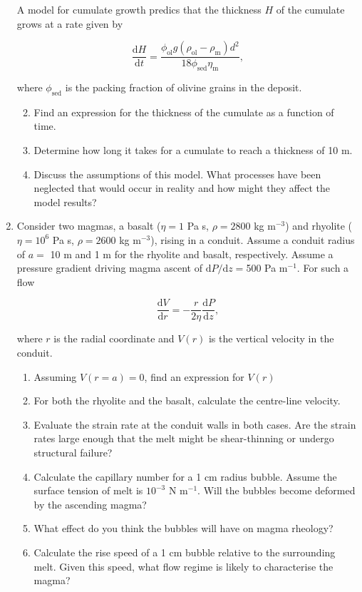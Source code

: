 \documentclass[]{book}
\theoremstyle{definition}
\begin{document}
\begin{enumerate}
  A model for cumulate growth predics that the thickness $H$ of the cumulate grows at a rate given by

  \begin{equation}
    \label{equ:cumulateGrowth}
    \frac{\mathrm{d} H}{\mathrm{d} t} = \frac{\phi_{\text{ol}} g (\rho_{\text{ol}} - \rho_{\text{m}}) d^{2}}{18 \phi_{\text{sed}} \eta_{\text{m}}},
  \end{equation}

  where $\phi_{\text{sed}}$ is the packing fraction of olivine grains in the deposit.

  \begin{enumerate}
    \setcounter{enumii}{1}
  \item Find an expression for the thickness of the cumulate as a function of time.
  \item Determine how long it takes for a cumulate to reach a thickness of 10 m.
  \item Discuss the assumptions of this model. What processes have been neglected that would occur in reality and how might they affect the model results? 
  \end{enumerate}

  
\item Consider two magmas, a basalt ($\eta = 1$ Pa s, $\rho = 2800$ kg m$^{-3}$) and rhyolite ($\eta = 10^{6}$ Pa s, $\rho = 2600$ kg m$^{-3}$), rising in a conduit. Assume a conduit radius of $a = $ 10 m and 1 m for the rhyolite and basalt, respectively. Assume a pressure gradient driving magma ascent of $ \mathrm{d} P / \mathrm{d} z = $500 Pa m$^{-1}$. For such a flow

  $$ \frac{\mathrm{d} V}{\mathrm{d} r} = -\frac{r}{2 \eta} \frac{\mathrm{d} P}{\mathrm{d} z},$$

  where $r$ is the radial coordinate and $V(r)$ is the vertical velocity in the conduit.

  \begin{enumerate}
  \item Assuming $V(r = a) = 0$, find an expression for $V(r)$ \\
  \item For both the rhyolite and the basalt, calculate the centre-line velocity. \\
  \item Evaluate the strain rate at the conduit walls in both cases. Are the strain rates large enough that the melt might be shear-thinning or undergo structural failure?
  \item Calculate the capillary number for a 1 cm radius bubble. Assume the surface tension of melt is $10^{-3}$ N m$^{-1}$. Will the bubbles become deformed by the ascending magma?
  \item What effect do you think the bubbles will have on magma rheology?
  \item Calculate the rise speed of a 1 cm bubble relative to the surrounding melt. Given this speed, what flow regime is likely to characterise the magma? \\
  \end{enumerate}
\end{enumerate}

  
\end{document}
